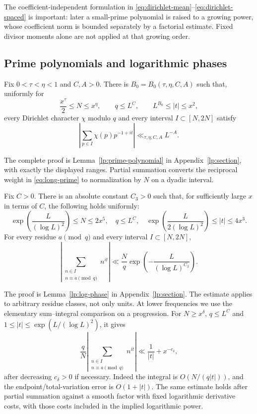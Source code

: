 The coefficient-independent formulation in
\eqref{eq:dirichlet-mean}--\eqref{eq:dirichlet-spaced} is important:
later a small-prime polynomial is raised to a growing power, whose
coefficient norm is bounded separately by a factorial estimate.
Fixed divisor moments alone are not applied at that growing order.

\subsection{Prime polynomials and logarithmic phases}

\begin{lemma}\label{lem:long-prime}
Fix $0<\tau<\eta<1$ and $C,A>0$.  There is
$B_0=B_0(\tau,\eta,C,A)$ such that, uniformly for
\[
 \frac{x^\tau}{2}\le N\le x^\eta,\qquad
 q\le L^C,\qquad L^{B_0}\le |t|\le x^2,
\]
every Dirichlet character $\chi$ modulo $q$ and every interval
$I\subset[N,2N]$ satisfy
\begin{equation}\label{eq:long-prime}
 \left|\sum_{p\in I}\chi(p)p^{-1+it}\right|
       \ll_{\tau,\eta,C,A}L^{-A}.
\end{equation}
\end{lemma}

The complete proof is Lemma~\ref{lp:prime-polynomial} in
Appendix~\ref{lp:section}, with exactly the displayed ranges. Partial
summation converts the reciprocal weight in \eqref{eq:long-prime}
to normalization by $N$ on a dyadic interval.

\begin{lemma}\label{lem:log-phase}
Fix $C>0$.  There is an absolute constant $C_3>0$ such that, for
sufficiently large $x$ in terms of $C$, the following holds uniformly:
\[
 \exp\!\left(\frac{L}{(\log L)^2}\right)\le N\le2x^5,
 \quad q\le L^C,
 \quad
 \exp\!\left(\frac{L}{2(\log L)^2}\right)\le |t|\le4x^3.
\]
For every residue $a\pmod q$ and every interval $I\subset[N,2N]$,
\begin{equation}\label{eq:log-phase}
 \left|\sum_{\substack{n\in I\\n\equiv a\pmod q}}n^{it}\right|
 \ll \frac Nq\exp\!\left(-\frac{L}{(\log L)^{C_3}}\right).
\end{equation}
\end{lemma}

The proof is Lemma~\ref{lp:log-phase} in Appendix~\ref{lp:section}.
The estimate applies to arbitrary residue
classes, not only units.  At lower frequencies we use the elementary
sum--integral comparison on a progression.  For $N\ge x^\delta$,
$q\le L^C$ and $1\le|t|\le\exp(L/(\log L)^2)$, it gives
\begin{equation}\label{eq:moderate-phase}
 \frac qN\left|\sum_{\substack{n\in I\\n\equiv a\pmod q}}n^{it}\right|
 \ll \frac1{|t|}+x^{-c_\delta},
\end{equation}
after decreasing $c_\delta>0$ if necessary.  Indeed the integral is
$O(N/(q|t|))$, and the endpoint/total-variation error is
$O(1+|t|)$.  The same estimate holds after partial summation against
a smooth factor with fixed logarithmic derivative costs, with those
costs included in the implied logarithmic power.

